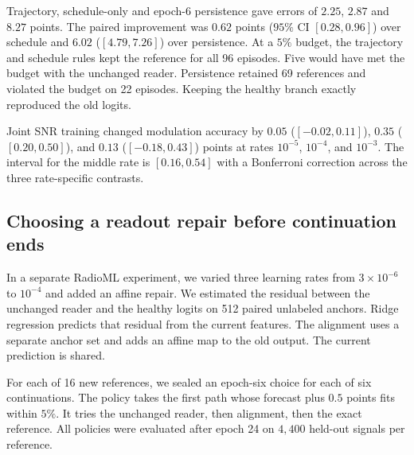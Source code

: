 Trajectory, schedule-only and epoch-6 persistence gave errors of
$2.25$, $2.87$ and $8.27$ points. The paired improvement was $0.62$
points ($95\%$ CI $[0.28,0.96]$) over schedule and $6.02$
($[4.79,7.26]$) over persistence. At a $5\%$ budget, the trajectory
and schedule rules kept the reference for all 96 episodes. Five
would have met the budget with the unchanged reader. Persistence
retained 69 references and violated the budget on 22 episodes.
Keeping the healthy branch exactly reproduced the old logits.

Joint SNR training changed modulation accuracy by $0.05$
($[-0.02,0.11]$), $0.35$ ($[0.20,0.50]$), and $0.13$
($[-0.18,0.43]$) points at rates $10^{-5}$, $10^{-4}$, and $10^{-3}$.
The interval for the middle rate is $[0.16,0.54]$ with a Bonferroni
correction across the three rate-specific contrasts.

\subsection{Choosing a readout repair before continuation ends}
\label{app:rml_early_repair}

In a separate RadioML experiment, we varied three learning rates from
$3\times10^{-6}$ to $10^{-4}$ and added an affine repair. We estimated
the residual between the unchanged reader and the healthy logits on
512 paired unlabeled anchors. Ridge regression predicts that residual
from the current features. The alignment uses a separate anchor set and
adds an affine map to the old output. The current prediction is shared.

For each of 16 new references, we sealed an epoch-six choice for each
of six continuations. The policy takes the first path whose forecast
plus $0.5$ points fits within $5\%$. It tries the unchanged reader,
then alignment, then the exact reference. All policies were evaluated
after epoch 24 on $4{,}400$ held-out signals per reference.

